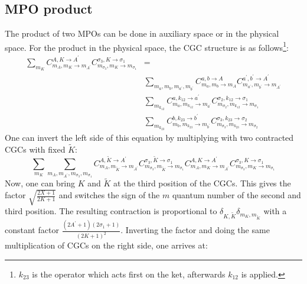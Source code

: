 \documentclass[a4paper,10pt,parskip=full]{scrartcl}
\begin{document}
\subsection{MPO product}
The product of two MPOs can be done in auxiliary space or in the
physical space. For the product in the physical space, the CGC
structure is as follows\footnote{$k_{23}$ is the operator which acts
  first on the ket, afterwards $k_{12}$ is applied.}:
\begin{equation}
  \begin{split}
  \sum_{m_K}C^{A,K\rightarrow A^\prime}_{m_A,m_{K}\rightarrow
    m_{A^\prime}}C^{\sigma_3,K\rightarrow
    \sigma_1}_{m_{\sigma_3},m_{K}\rightarrow m_{\sigma_1}}&=\\
  &\sum_{m_{a},m_{b},m_{a^\prime},m_{b^\prime}} C^{a,b\rightarrow A}_{{m_a,m_{b}}\rightarrow m_{A}}C^{a^\prime,b^\prime\rightarrow A^\prime}_{m_{a^\prime},m_{b^\prime}\rightarrow m_{A^\prime}}\\
  &\sum_{m_{k_{12}}}C^{a,k_{12}\rightarrow
    a^\prime}_{m_a,m_{k_{12}}\rightarrow
    m_{a^\prime}}C^{\sigma_2,k_{12}\rightarrow
    \sigma_1}_{m_{\sigma_2},m_{k_{12}}\rightarrow m_{\sigma_1}}\\
  &\sum_{m_{k_{23}}}C^{b,k_{23}\rightarrow b^\prime}_{m_b,m_{k_{23}}\rightarrow m_{b^\prime}}C^{\sigma_3,k_{23}\rightarrow \sigma_2}_{m_{\sigma_3},m_{k_{23}}\rightarrow m_{\sigma_2}}
  \end{split}
\end{equation}
One can invert the left side of this equation by multiplying with two
contracted CGCs with fixed $\tilde{K}$:
\begin{equation}
  \sum_{m_K}\sum_{m_{A},m_{A^\prime},m_{\sigma_3},m_{\sigma_1}}C^{A,\tilde{K}\rightarrow
    A^\prime}_{m_A,m_{\tilde{K}}\rightarrow m_{A^\prime}}C^{\sigma_3,\tilde{K}\rightarrow\sigma_1}_{m_{\sigma_3},m_{\tilde{K}}\rightarrow
    m_{\sigma_1}}
  C^{A,K\rightarrow
    A^\prime}_{m_A,m_{K}\rightarrow m_{A^\prime}}C^{\sigma_3,K\rightarrow\sigma_1}_{m_{\sigma_3},m_{K}\rightarrow
    m_{\sigma_1}}  
\end{equation}
Now, one can bring $K$ and $\tilde{K}$ at the third position of the
CGCs. This gives the factor $\sqrt{\frac{2X+1}{2K+1}}$ and switches
the sign of the $m$ quantum number of the second and third position.
The resulting contraction is proportional to
$\delta_{K,\tilde{K}}\delta_{m_K,m_{\tilde{K}}}$ with a constant
factor $\frac{(2A^\prime+1)(2\sigma_1+1)}{(2K+1)^2}$.
Inverting the factor and doing the same multiplication of CGCs on the
right side, one arrives at:
\end{document}
